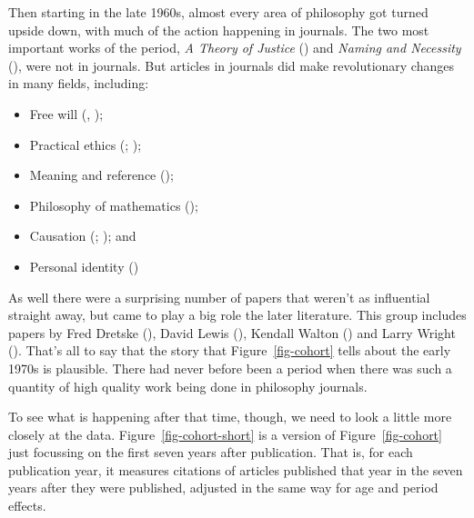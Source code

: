 \documentclass[
  12pt,
  letterpaper,
  DIV=11,
  numbers=noendperiod]{scrartcl}
\providecommand{\tightlist}{%
  \setlength{\itemsep}{0pt}\setlength{\parskip}{0pt}}
\begin{document}
Then starting in the late 1960s, almost every area of philosophy got
turned upside down, with much of the action happening in journals. The
two most important works of the period, \emph{A Theory of Justice}
() and \emph{Naming and Necessity}
(), were not in
journals. But articles in journals did make revolutionary changes in
many fields, including:

\begin{itemize}
\tightlist
\item
  Free will (,
  );
\item
  Practical ethics (;
  );
\item
  Meaning and reference ();
\item
  Philosophy of mathematics ();
\item
  Causation (;
  ); and
\item
  Personal identity ()
\end{itemize}

As well there were a surprising number of papers that weren't as
influential straight away, but came to play a big role the later
literature. This group includes papers by Fred Dretske
(), David Lewis
(), Kendall Walton
() and Larry Wright
(). That's all to say that the
story that Figure~\ref{fig-cohort} tells about the early 1970s is
plausible. There had never before been a period when there was such a
quantity of high quality work being done in philosophy journals.

To see what is happening after that time, though, we need to look a
little more closely at the data. Figure~\ref{fig-cohort-short} is a
version of Figure~\ref{fig-cohort} just focussing on the first seven
years after publication. That is, for each publication year, it measures
citations of articles published that year in the seven years after they
were published, adjusted in the same way for age and period effects.
\end{document}
